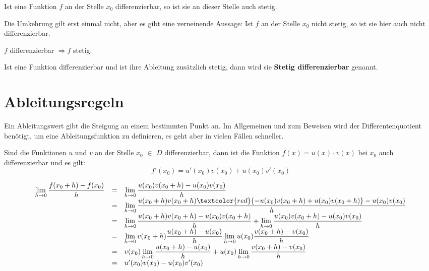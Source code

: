 \documentclass[main.tex]{subfiles}
\begin{document}
Ist eine Funktion $f$ an der Stelle $x_{0}$ differenzierbar, so ist sie an dieser Stelle auch stetig.

Die Umkehrung gilt erst einmal nicht, aber es gibt eine verneinende Aussage: Ist $f$ an der Stelle $x_{0}$ nicht stetig, so ist sie hier auch nicht differenzierbar.

\begin{Theorem}
	$f$ differenzierbar $\Rightarrow f$ stetig.
\end{Theorem}
\begin{Bemerkung}
	Ist eine Funktion differenzierbar und ist ihre Ableitung zusätzlich stetig, dann wird sie \textbf{Stetig differenzierbar} genannt.
\end{Bemerkung}


\section{Ableitungsregeln}

Ein Ableitungswert gibt die Steigung an einem bestimmten Punkt an. Im Allgemeinen und zum Beweisen wird der Differentenquotient benötigt, um eine Ableitungsfunktion zu definieren, es geht aber in vielen Fällen schneller.

\begin{Theorem}[Produktregel]
	Sind die Funktionen $u$ und $v$ an der Stelle $x_{0}$ $\in$ $D$ differenzierbar, dann ist die Funktion $f(x)=u(x)\cdot v(x)$ bei $x_{0}$ auch differenzierbar und es gilt:
	$$f'(x_{0}) = u'(x_{0})v(x_{0})+u(x_{0})v'(x_{0})$$
\end{Theorem}

\begin{Beweis}
	$$\begin{array}{rcl}
		\lim\limits_{h \rightarrow 0} {\dfrac{f(x_{0}+h)-f(x_{0})}{h}} & = & \lim\limits_{h \rightarrow 0} {\dfrac{u(x_{0})v({x_{0}+h)-u(x_{0})v(x_{0})}}{h}}\\
		&=&\lim\limits_{h \rightarrow 0} {\dfrac{u(x_{0}+h)v(x_{0}+h)\textcolor{red}{-u(x_{0})v(x_{0}+h)+u(x_{0})v(x_{0}+h)}-u(x_{0})v(x_{0}) }{h}}\\
		&=&\lim\limits_{h \rightarrow 0} {\dfrac{u(x_{0}+h)v(x_{0}+h)-u(x_{0})v(x_{0}+h)}{h}} + \lim\limits_{h \rightarrow 0} {\dfrac{u(x_{0})v(x_{0}+h)-u(x_{0})v(x_{0})}{h}}\\
		&=&\lim\limits_{h \rightarrow 0} {v(x_{0}+h)\dfrac{u(x_{0}+h)-u(x_{0})}{h}} \lim\limits_{h \rightarrow 0} {u(x_{0})\dfrac{v(x_{0}+h)-v(x_{0})}{h}}\\
		&=& v(x_{0})\lim\limits_{h \rightarrow 0}{\dfrac{u(x_{0}+h)-u(x_{0})}{h}} +u(x_{0}) \lim\limits_{h \rightarrow 0} {\dfrac{v(x_{0}+h)-v(x_{0})}{h}}\\
		&=& u'(x_{0})v(x_{0}) - u(x_{0})v'(x_{0})
	\end{array}$$
\end{Beweis}
\end{document}
